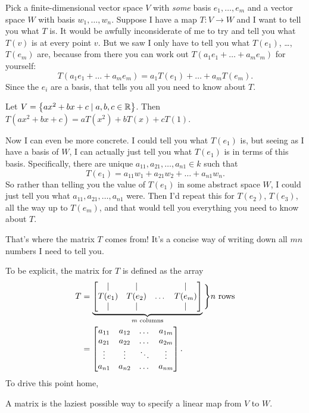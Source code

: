 Pick a finite-dimensional vector space $V$ with \emph{some} basis $e_1, \dots, e_m$
and a vector space $W$ with basis $w_1, \dots, w_n$.
Suppose I have a map $T \colon V \to W$ and I want to tell you what $T$ is.
It would be awfully inconsiderate of me to try and tell you what $T(v)$
is at every point $v$.
But we saw I only have to tell you what $T(e_1)$, \dots, $T(e_m)$ are,
because from there you can work out
$T(a_1 e_1 + \dots + a_m e_m)$ for yourself:
\[ T(a_1 e_1 + \dots + a_m e_m) = a_1 T(e_1) + \dots + a_m T(e_m). \]
Since the $e_i$ are a basis, that tells you all you need to know about $T$.
\begin{example}
	Let $V = \left\{ ax^2+bx+c \mid a,b,c \in \mathbb R \right\}$.
	Then $T(ax^2+bx+c) = aT(x^2) + bT(x) + cT(1)$.
\end{example}

Now I can even be more concrete.
I could tell you what $T(e_1)$ is, but seeing as I have a basis of $W$,
I can actually just tell you what $T(e_1)$ is in terms of this basis.
Specifically, there are unique $a_{11}, a_{21}, \dots, a_{n1} \in k$ such that
\[ T(e_1) = a_{11} w_1 + a_{21} w_2 + \dots + a_{n1} w_n. \]
So rather than telling you the value of $T(e_1)$ in some abstract space $W$,
I could just tell you what $a_{11}, a_{21}, \dots, a_{n1}$ were.
Then I'd repeat this for $T(e_2)$, $T(e_3)$, all the way up to $T(e_m)$,
and that would tell you everything you need to know about $T$.

That's where the matrix $T$ comes from!
It's a concise way of writing down all $mn$ numbers
I need to tell you.

To be explicit, the matrix for $T$ is defined as the array
\begin{align*}
	T &= \underbrace{%
	\begin{bmatrix}
		\mid & \mid & & \mid \\
		T(e_1) & T(e_2) & \dots & T(e_{m}) \\
		\mid & \mid & & \mid \\
	\end{bmatrix}
	}_{\text{$m$ columns}} \Bigg\} \text{$n$ rows} \\
	&=
	\begin{bmatrix}
		a_{11} & a_{12} & \dots & a_{1m} \\
		a_{21} & a_{22} & \dots & a_{2m} \\
		\vdots & \vdots & \ddots & \vdots \\
		a_{n1} & a_{n2} & \dots & a_{nm}
	\end{bmatrix}.
\end{align*}
To drive this point home,
\begin{moral}
	A matrix is the laziest possible way to specify
	a linear map from $V$ to $W$.
\end{moral}

